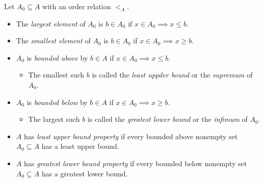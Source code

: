 \documentclass[MAS331_Note.tex]{subfiles}
\begin{document}
 {
	Let $A_0 \subseteq A$ with an order relation $<_A$.
	\begin{itemize}[noitemsep]
		\item The \textit{largest element} of $A_0$ is $b \in A_0$ if $x \in A_0 \implies x \le b$.
		\item The \textit{smallest element} of $A_0$ is $b \in A_0$ if $x \in A_0 \implies x \ge b$.
	\end{itemize}
	\begin{itemize}[noitemsep]
		\item $A_0$ is \textit{bounded above} by $b \in A$ if $x \in A_0 \implies x \le b$.
		      \begin{itemize}[nolistsep]
			      \item The smallest such $b$ is called the \textit{least uppder bound} or the \textit{supremum} of $A_0$.
		      \end{itemize}
		\item $A_0$ is \textit{bounded below} by $b \in A$ if $x \in A_0 \implies x \ge b$.
		      \begin{itemize}[nolistsep]
			      \item The largest such $b$ is called the \textit{greatest lower bound} or the \textit{infimum} of $A_0$.
		      \end{itemize}
	\end{itemize}
	\begin{itemize}[noitemsep]
		\item $A$ has \textit{least upper bound property} if every bounded above nonempty set $A_0 \subseteq A$
		      has a least upper bound.
		\item $A$ has \textit{greatest lower bound property} if every bounded below nonempty set $A_0 \subseteq A$
		      has a greatest lower bound.
	\end{itemize}
}
\end{document}
